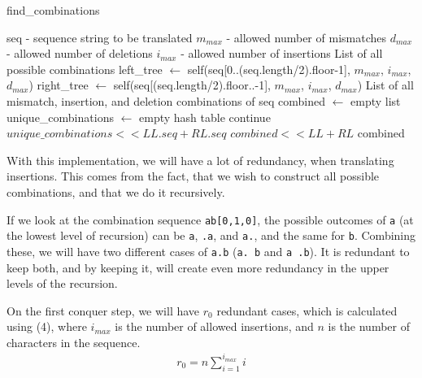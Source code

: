 \documentclass[12pt]{article}
\theoremstyle{definition}
\newcounter{subsubsubsection}[subsubsection]
\newcommand*\Let[2]{\State #1 $\gets$ #2}
\newcommand*\Returns[1]{\State \Return #1}
\newcommand*\Append[2]{\State $#1 << #2$}
\begin{document}
\begin{spacing}{0.8}
\begin{algorithm}
	\caption{find\_combinations}
	\label{alg:find_combinations}
  	\begin{algorithmic}[1]
    		\Require
    			\Statex seq - sequence string to be translated
    			\Statex $m_{max}$ - allowed number of mismatches
    			\Statex $d_{max}$ - allowed number of deletions
    			\Statex $i_{max}$ - allowed number of insertions
    		\Ensure
    			\Statex List of all possible combinations
		\Statex
    			\Let{left\_tree}{self(seq[0..(seq.length/2).floor-1], $m_{max}$, $i_{max}$, $d_{max}$)}
    			\Let{right\_tree}{self(seq[(seq.length/2).floor..-1], $m_{max}$, $i_{max}$, $d_{max}$)}
    		\Else
    			\Returns{List of all mismatch, insertion, and deletion combinations of seq}
    		\EndIf
    		\State
    		\Let{combined}{empty list}
    		\Let{unique\_combinations}{empty hash table}
    		 
    			 
    					\State continue
    				\EndIf
    					\Append{unique\_combinations}{LL.seq + RL.seq}
    					\Append{combined}{LL + RL}
    				\EndIf
    			\EndFor
    		\EndFor
    		\Returns{combined}
  	\end{algorithmic}
\end{algorithm}
\end{spacing}

\newpage
{}

With this implementation, we will have a lot of redundancy, when translating insertions. This comes from the fact, that we wish to construct all possible combinations, and that we do it recursively.

If we look at the combination sequence \texttt{ab[0,1,0]}, the possible outcomes of \texttt{a} (at the lowest level of recursion) can be \texttt{a}, \texttt{.a}, and \texttt{a.}, and the same for \texttt{b}. Combining these, we will have two different cases of \texttt{a.b} (\texttt{a. b} and \texttt{a .b}). It is redundant to keep both, and by keeping it, will create even more redundancy in the upper levels of the recursion.

On the first conquer step, we will have $r_0$ redundant cases, which is calculated using (4), where $i_{max}$ is the number of allowed insertions, and $n$ is the number of characters in the sequence.
\begin{eqnarray}
	r_0 = n\sum^{i_{max}}_{i=1} i
\end{eqnarray}
\end{document}
